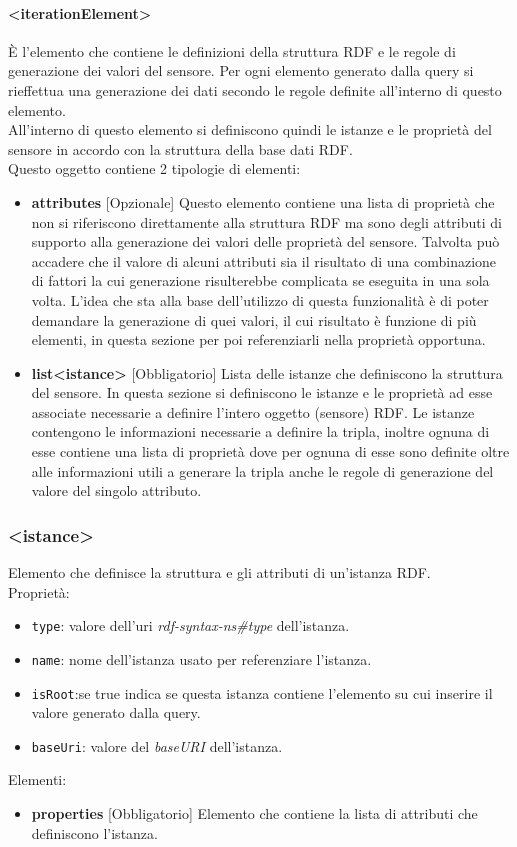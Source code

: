 \documentclass[12pt,a4paper,italian]{article}
\begin{document}
\paragraph{\large{<iterationElement>}}
\`E l'elemento che contiene le definizioni della struttura RDF e le regole di generazione dei valori del sensore. Per ogni elemento generato dalla query si
rieffettua una generazione dei dati secondo le regole definite all'interno di questo elemento.\\
All'interno di questo elemento si definiscono quindi le istanze e le proprietà del sensore in accordo con la struttura della base dati RDF.\\
Questo oggetto contiene 2 tipologie di elementi:
\begin{itemize}
	\item \textbf{attributes} [Opzionale] Questo elemento contiene una lista di proprietà che non si riferiscono direttamente alla struttura RDF ma sono degli attributi 
	di supporto alla generazione dei valori delle proprietà del sensore. Talvolta può accadere che il valore di alcuni attributi sia il risultato di una combinazione di fattori la cui generazione 
	risulterebbe complicata se eseguita in una sola volta. L'idea che sta alla base dell'utilizzo di questa funzionalità è di poter demandare la generazione di quei valori, il cui risultato è funzione di più elementi,
	in questa sezione per poi referenziarli nella proprietà opportuna.
	\item \textbf{list<istance>} [Obbligatorio] Lista delle istanze che definiscono la struttura del sensore. In questa sezione si definiscono le istanze e 
	le proprietà ad esse associate necessarie a definire l'intero oggetto (sensore) RDF. Le istanze contengono le informazioni necessarie a definire la tripla, inoltre ognuna di esse contiene 
	una lista di proprietà dove per ognuna di esse sono definite oltre alle informazioni utili a generare la tripla anche le regole di generazione del valore del singolo attributo.
\end{itemize} 
\subsubsection{\large{<istance>}}
Elemento che definisce la struttura e gli attributi di un'istanza RDF.\\
Proprietà:
\begin{itemize}
	\item \texttt{type}: valore dell'uri \emph{rdf-syntax-ns\#type} dell'istanza.
	\item \texttt{name}: nome dell'istanza usato per referenziare l'istanza.
	\item \texttt{isRoot}:se true indica se questa istanza contiene l'elemento su cui inserire il valore generato dalla query.
	\item \texttt{baseUri}: valore del \emph{baseURI} dell'istanza.
\end{itemize}
Elementi:
\begin{itemize}
	\item \textbf{properties} [Obbligatorio] Elemento che contiene la lista di attributi che definiscono l'istanza.
\end{itemize}
\end{document}
